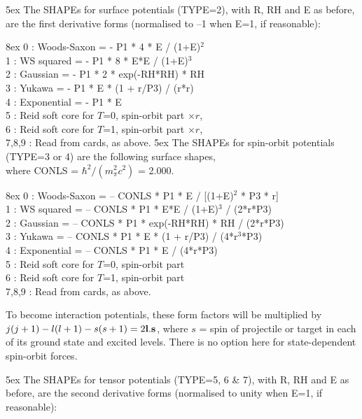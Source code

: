 \documentclass[11pt]{article}
\begin{document}
\hangindent 5ex
The SHAPEs for surface potentials (TYPE=2), with R, RH and E as before,
are the first derivative forms (normalised to --1 when E=1,
if reasonable):

\hangindent 8ex
      0 : Woods-Saxon  = - P1 * 4 * E / (1+E)$^2$ \\
      1 : WS squared   = - P1 * 8 * E*E / (1+E)$^3$\\
      2 : Gaussian     = - P1 * 2 * exp(-RH*RH) * RH\\
      3 : Yukawa       = - P1 * E * (1 + r/P3) / (r*r)\\
      4 : Exponential  = - P1 * E\\
      5 : Reid soft core for $T$=0, spin-orbit part $\times r$,\\
      6 : Reid soft core for $T$=1, spin-orbit part $\times r$,\\
      7,8,9 : Read from cards, as above.
\bigskip
\newpage
\hangindent 5ex
The SHAPEs for spin-orbit potentials (TYPE=3 or 4) are the following surface
shapes, \\ where CONLS = $\hbar^2/(m_\pi^2 c^2)$ = 2.000.

\hangindent 8ex
      0 : Woods-Saxon  = -- CONLS * P1 *  E / [(1+E)$^2$ * P3 * r] \\
      1 : WS squared   = -- CONLS * P1 * E*E / (1+E)$^3$  / (2*r*P3) \\
      2 : Gaussian     = -- CONLS * P1 * exp(-RH*RH) * RH  / (2*r*P3) \\
      3 : Yukawa       = -- CONLS * P1 * E * (1 + r/P3) / (4*r$^3$*P3)\\
      4 : Exponential  = -- CONLS * P1 * E / (4*r*P3)\\
      5 : Reid soft core for $T$=0, spin-orbit part\\
      6 : Reid soft core for $T$=1, spin-orbit part\\
      7,8,9 : Read from cards, as above.

To become interaction potentials,
these form factors will be multiplied by
$j(j+1) - l(l+1) - s(s+1)= 2{\bf l}.{\bf s}$, where $s$ = spin of projectile or target
in each of its ground state and excited levels. There is no option here for
state-dependent spin-orbit forces.
\bigskip

\hangindent 5ex
The SHAPEs for tensor potentials (TYPE=5, 6 \& 7), with R, RH and E as before,
are the second derivative forms (normalised to unity when E=1,
if reasonable):
\end{document}
